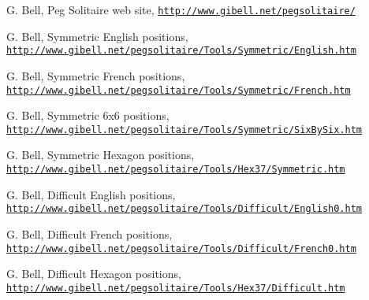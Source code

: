 \documentclass[12pt,reqno]{article}
\begin{document}
\begin{thebibliography}{mybib}
 G. Bell, Peg Solitaire web site,
\href{http://www.gibell.net/pegsolitaire/}
{\tt http://www.gibell.net/pegsolitaire/}

 G. Bell, Symmetric English positions,\newline
\href{http://www.gibell.net/pegsolitaire/Tools/Symmetric/English.htm}
{\tt http://www.gibell.net/pegsolitaire/Tools/Symmetric/English.htm}

 G. Bell, Symmetric French positions,\newline
\href{http://www.gibell.net/pegsolitaire/Tools/Symmetric/French.htm}
{\tt http://www.gibell.net/pegsolitaire/Tools/Symmetric/French.htm}

 G. Bell, Symmetric 6x6 positions,\newline
\href{http://www.gibell.net/pegsolitaire/Tools/Symmetric/SixBySix.htm}
{\tt http://www.gibell.net/pegsolitaire/Tools/Symmetric/SixBySix.htm}

 G. Bell, Symmetric Hexagon positions,\newline
\href{http://www.gibell.net/pegsolitaire/Tools/Hex37/Symmetric.htm}
{\tt http://www.gibell.net/pegsolitaire/Tools/Hex37/Symmetric.htm}

 G. Bell, Difficult English positions,\newline
\href{http://www.gibell.net/pegsolitaire/Tools/Difficult/English0.htm}
{\tt http://www.gibell.net/pegsolitaire/Tools/Difficult/English0.htm}

 G. Bell, Difficult French positions,\newline
\href{http://www.gibell.net/pegsolitaire/Tools/Difficult/French0.htm}
{\tt http://www.gibell.net/pegsolitaire/Tools/Difficult/French0.htm}

 G. Bell, Difficult Hexagon positions,\newline
\href{http://www.gibell.net/pegsolitaire/Tools/Hex37/Difficult.htm}
{\tt http://www.gibell.net/pegsolitaire/Tools/Hex37/Difficult.htm}

\end{thebibliography}
\end{document}
